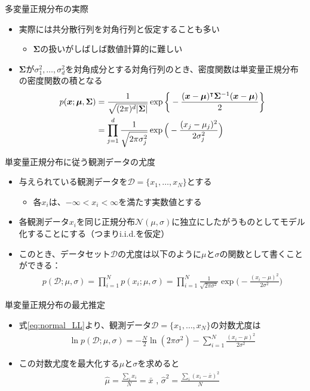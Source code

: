 \documentclass[aspectratio=169,unicode,dvipdfmx,14pt]{beamer}
\begin{document}
\begin{frame}{多変量正規分布の実際}
\begin{itemize}
\item 実際には共分散行列を対角行列と仮定することも多い
\begin{itemize}
\item $\bm{\Sigma}$の扱いがしばしば数値計算的に難しい
\end{itemize}
\item $\bm{\Sigma}$が$\sigma_1^2,\ldots,\sigma_d^2$を対角成分とする対角行列のとき、密度関数は単変量正規分布の密度関数の積となる
\begin{align}
p(\bm{x};\bm{\mu},\bm{\Sigma}) & = \frac{1}{\sqrt{(2\pi)^d|\bm{\Sigma}|}}\exp\bigg\{ - \frac{(\bm{x} - \bm{\mu})^\intercal \bm{\Sigma}^{-1} (\bm{x} -\bm{\mu})}{2} \bigg\}
\notag \\ & =
\prod_{j=1}^d \frac{1}{\sqrt{2\pi\sigma_j^2}}\exp\Big( - \frac{(x_j - \mu_j)^2}{2\sigma_j^2} \Big)
\end{align}
\end{itemize}
\end{frame}

\begin{frame}{単変量正規分布に従う観測データの尤度}
\begin{itemize}
\item 与えられている観測データを$\mathcal{D}=\{x_1,\ldots,x_N\}$とする
\begin{itemize}
\item 各$x_i$は、$-\infty < x_i < \infty$を満たす実数値とする
\end{itemize}
\item 各観測データ$x_i$を同じ正規分布$\mathcal{N}(\mu,\sigma)$に独立にしたがうものとしてモデル化することにする（つまりi.i.d.を仮定）
\item このとき、データセット$\mathcal{D}$の尤度は以下のように$\mu$と$\sigma$の関数として書くことができる：
\begin{align}
p(\mathcal{D};\mu,\sigma)=\prod_{i=1}^N p(x_i;\mu,\sigma)
=\prod_{i=1}^N \frac{1}{\sqrt{2\pi\sigma^2}}\exp\bigg( - \frac{(x_i - \mu)^2}{2\sigma^2}\bigg)
\label{eq:normal_LL}
\end{align}
\end{itemize}
\end{frame}


\begin{frame}{単変量正規分布の最尤推定}
\begin{itemize}
\item 式\eqref{eq:normal_LL}より、観測データ$\mathcal{D}=\{ x_1, \ldots, x_N \}$の対数尤度は
\begin{align}
\ln p(\mathcal{D};\mu,\sigma)
= - \frac{N}{2}\ln(2\pi\sigma^2) - \sum_{i=1}^N \frac{(x_i - \mu)^2}{2\sigma^2}
\end{align}
\item この対数尤度を最大化する$\mu$と$\sigma$を求めると
\begin{align}
\hat{\mu} = \frac{\sum_i x_i}{N} = \bar{x} \mbox{ , \ }
\hat{\sigma}^2 = \frac{\sum_i (x_i - \bar{x})^2}{N}
\end{align}
\end{itemize}
\end{frame}
\end{document}
